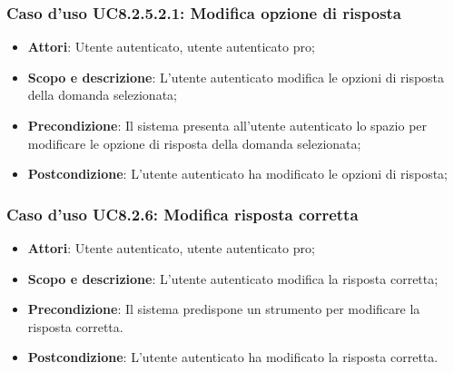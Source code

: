 		\subsubsection{Caso d'uso UC8.2.5.2.1: Modifica opzione di risposta}
		\begin{itemize}
		\item
			\textbf{Attori}: Utente autenticato, utente autenticato pro;
		\item
			\textbf{Scopo e descrizione}: L'utente autenticato modifica le opzioni di risposta della domanda selezionata;
		\item		
			\textbf{Precondizione}: Il sistema presenta all'utente autenticato lo spazio per modificare le opzione di risposta della domanda selezionata;
		\item		
			\textbf{Postcondizione}: L'utente autenticato ha modificato le opzioni di  risposta;
		\end{itemize}
	\subsubsection{Caso d'uso UC8.2.6: Modifica risposta corretta}
		\begin{itemize}
		\item
			\textbf{Attori}: Utente autenticato, utente autenticato pro;
		\item
			\textbf{Scopo e descrizione}: L'utente autenticato modifica la risposta corretta;
		\item		
			\textbf{Precondizione}: Il sistema predispone un strumento per modificare la risposta corretta.
		\item		
			\textbf{Postcondizione}: L'utente autenticato ha modificato la risposta corretta.
		\end{itemize}
